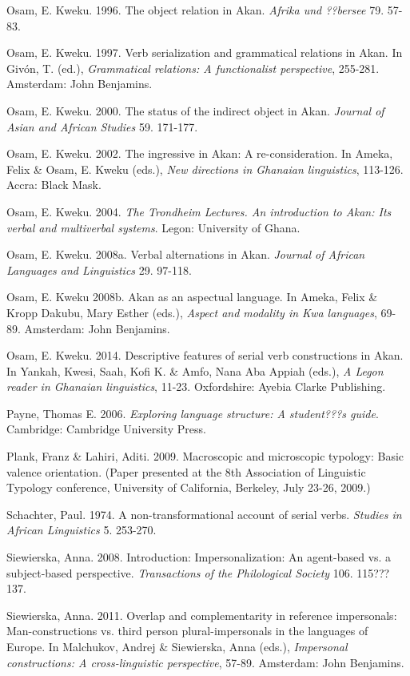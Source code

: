 \documentclass[output=paper]{langsci/langscibook}
\begin{document}
Osam, E. Kweku. 1996. The object relation in Akan. \textit{Afrika und ??bersee} 79. 57-83.

Osam, E. Kweku. 1997. Verb serialization and grammatical relations in Akan. In Givón, T. (ed.), \textit{Grammatical relations: A functionalist perspective}, 255-281. Amsterdam: John Benjamins.

Osam, E. Kweku. 2000. The status of the indirect object in Akan. \textit{Journal of Asian and African Studies }59. 171-177.

Osam, E. Kweku. 2002. The ingressive in Akan: A re-consideration. In Ameka, Felix \& Osam, E. Kweku (eds.), \textit{New directions in Ghanaian linguistics}, 113-126. Accra: Black Mask.

Osam, E. Kweku. 2004. \textit{The Trondheim Lectures. An introduction to Akan: Its verbal and multiverbal systems}. Legon: University of Ghana.

Osam, E. Kweku. 2008a. Verbal alternations in Akan. \textit{Journal of African Languages and Linguistics} 29. 97-118.

Osam, E. Kweku 2008b. Akan as an aspectual language. In Ameka, Felix \& Kropp Dakubu, Mary Esther (eds.), \textit{Aspect and modality in Kwa languages}, 69-89. Amsterdam: John Benjamins.

Osam, E. Kweku. 2014. Descriptive features of serial verb constructions in Akan. In Yankah, Kwesi, Saah, Kofi K. \& Amfo, Nana Aba Appiah (eds.), \textit{A Legon reader in Ghanaian linguistics}, 11-23. Oxfordshire: Ayebia Clarke Publishing.

Payne, Thomas E. 2006. \textit{Exploring language structure: A student???s guide}. Cambridge: Cambridge University Press.

Plank, Franz \& Lahiri, Aditi. 2009. Macroscopic and microscopic typology: Basic valence orientation. (Paper presented at the 8th Association of Linguistic Typology conference, University of California, Berkeley, July 23-26, 2009.)

Schachter, Paul. 1974. A non-transformational account of serial verbs. \textit{Studies in African Linguistics} 5. 253-270.

Siewierska, Anna. 2008. Introduction: Impersonalization: An agent-based vs. a subject-based perspective. \textit{Transactions of the Philological Society} 106. 115???137.

Siewierska, Anna. 2011. Overlap and complementarity in reference impersonals: Man-constructions vs. third person plural-impersonals in the languages of Europe. In Malchukov, Andrej \& Siewierska, Anna (eds.), \textit{Impersonal constructions: A cross-linguistic perspective}, 57-89. Amsterdam: John Benjamins.
\end{document}
